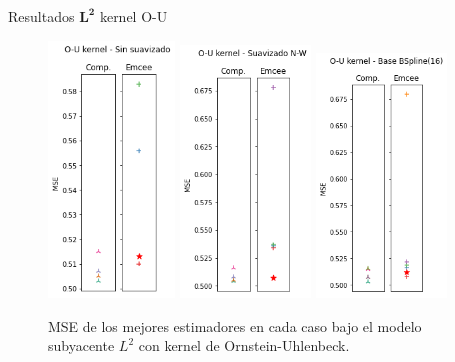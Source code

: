 \documentclass[10pt, professionalfonts]{beamer}
\begin{document}
\begin{frame}{Resultados $\boldsymbol{L^2}$ kernel O-U}
  \begin{figure}
    \includegraphics[width=0.3\textwidth]{img/results-new/reg_l2_ou_none}\hfill
    \includegraphics[width=0.31\textwidth]{img/results-new/reg_l2_ou_nw}\hfill
    \includegraphics[width=0.31\textwidth]{img/results-new/reg_l2_ou_basis}
    \caption{MSE de los mejores estimadores en cada caso bajo el modelo subyacente $L^2$ con kernel de Ornstein-Uhlenbeck.}
  \end{figure}
\end{frame}
\end{document}

